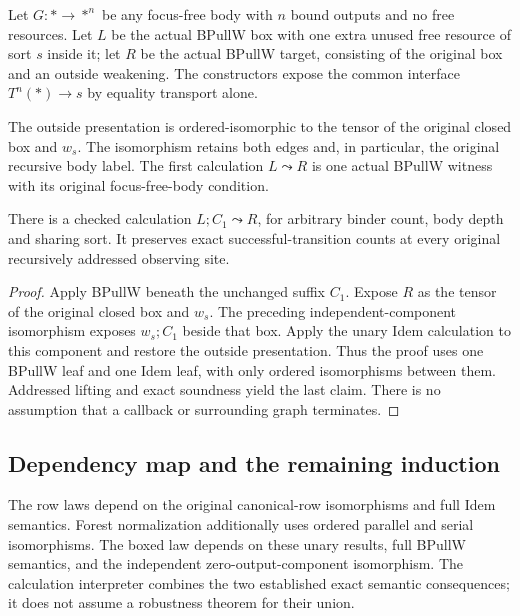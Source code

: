 \begin{definition}
Let $G:*\to *^n$ be any focus-free body with $n$ bound outputs and no free
resources. Let $L$ be the actual BPullW box with one extra unused free
resource of sort $s$ inside it; let $R$ be the actual BPullW target, consisting
of the original box and an outside weakening. The constructors expose the
common interface $T^n(*)\to s$ by equality transport alone.
\end{definition}

The outside presentation is ordered-isomorphic to the tensor of the original
closed box and $w_s$. The isomorphism retains both edges and, in particular,
the original recursive body label. The first calculation $L\leadsto R$ is
one actual BPullW witness with its original focus-free-body condition.

\begin{theorem}
There is a checked calculation $L;C_1\leadsto R$, for arbitrary binder count,
body depth and sharing sort. It preserves exact successful-transition counts
at every original recursively addressed observing site.
\end{theorem}
\begin{proof}
Apply BPullW beneath the unchanged suffix $C_1$. Expose $R$ as the tensor of
the original closed box and $w_s$. The preceding independent-component
isomorphism exposes $w_s;C_1$ beside that box. Apply the unary Idem
calculation to this component and restore the outside presentation. Thus the
proof uses one BPullW leaf and one Idem leaf, with only ordered isomorphisms
between them. Addressed lifting and exact soundness yield the last claim.
There is no assumption that a callback or surrounding graph terminates.
\end{proof}

\subsection{Dependency map and the remaining induction}
The row laws depend on the original canonical-row isomorphisms and full
Idem semantics. Forest normalization additionally uses ordered parallel and
serial isomorphisms. The boxed law depends on these unary results, full
BPullW semantics, and the independent zero-output-component isomorphism.
The calculation interpreter combines the two established exact semantic
consequences; it does not assume a robustness theorem for their union.

